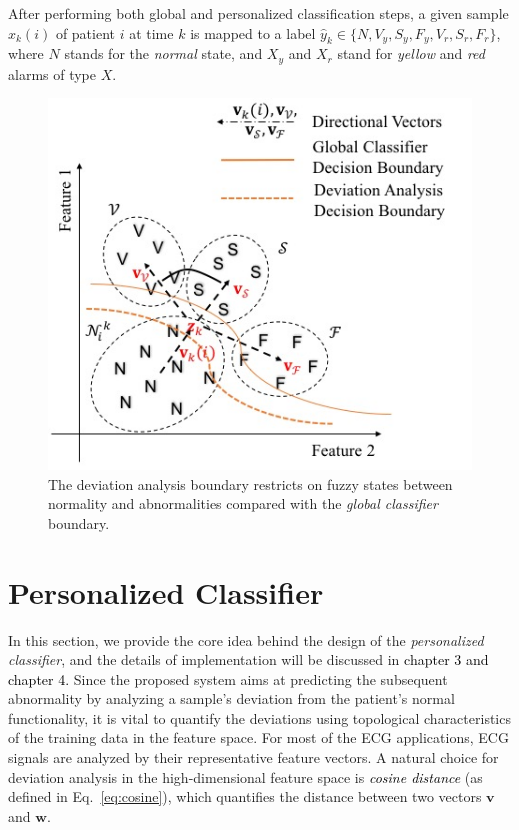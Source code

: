 After performing both global and personalized classification steps, a given sample $x_k(i)$ of patient $i$ at time $k$ is mapped to a label $\hat{y}_k \in \{N,V_y,S_y,F_y,V_r,S_r,F_r\}$, where $N$ stands for the \textit{normal} state, and $X_y$ and $X_r$ stand for \textit{yellow} and \textit{red} alarms of type $X$.

\begin{figure}[t]
\centering
\includegraphics[scale=.6]{Fig/topology.jpg}
\caption{The deviation analysis boundary restricts on fuzzy states between normality and abnormalities compared with the \textit{global classifier} boundary.}
\label{fig:topo_deviation}
\vspace{-1in}
\end{figure}


\section{Personalized Classifier} %

In this section, we provide the core idea behind the design of the \textit{personalized classifier}, and the details of implementation will be discussed in \textcolor{black}{chapter 3 and chapter 4.} 
Since the proposed system aims at predicting the subsequent abnormality by analyzing a sample's deviation from the patient's normal functionality, it is vital to quantify the deviations using topological characteristics of the training data in the feature space. For most of the ECG applications, ECG signals are analyzed by their representative feature vectors. A natural choice for deviation analysis in the high-dimensional feature space is \textcolor{black}{\textit{cosine distance}} (as defined in Eq.~\ref{eq:cosine}), which quantifies the distance between two vectors $\textbf{v}$ and $\textbf{w}$.

